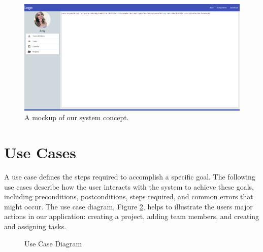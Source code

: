 \begin{figure}[ht]
\includegraphics[width=\textwidth]{mockup.png}
\caption{A mockup of our system concept.}
\label{mockup}
\end{figure}
\FloatBarrier

\section{Use Cases}
A use case defines the steps required to accomplish a specific goal. The following use cases describe how the user interacts with the system to achieve these goals, including preconditions, postconditions, steps required, and common errors that might occur. The use case diagram, Figure \ref{ucd}, helps to illustrate the user\textsc{}s major actions in our application: creating a project, adding team members, and creating and assigning tasks. 
\begin{figure}[ht]
\centering
{}
\caption{Use Case Diagram}
\label{ucd}
\end{figure}

